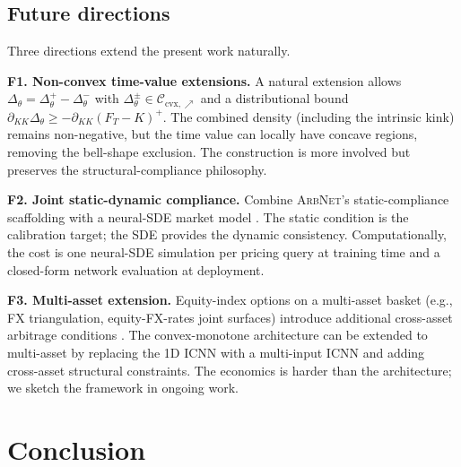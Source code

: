 \documentclass[largeformat]{interact}
\let\cite\citep   %
\theoremstyle{plain}
\theoremstyle{definition}
\newcommand{\arbnet}{\textsc{ArbNet}}
\begin{document}
\subsection{Future directions}
\label{sec:future}

Three directions extend the present work naturally.

\smallskip\noindent\textbf{F1. Non-convex time-value extensions.}
A natural extension allows $\Delta_\theta = \Delta^{+}_\theta - \Delta^{-}_\theta$ with $\Delta^{\pm}_\theta \in \mathcal{C}_{\mathrm{cvx},\nearrow}$ and a distributional bound $\partial_{KK}\Delta_\theta \geq -\partial_{KK}(F_T - K)^+$. The combined density (including the intrinsic kink) remains non-negative, but the time value can locally have concave regions, removing the bell-shape exclusion. The construction is more involved but preserves the structural-compliance philosophy.

\smallskip\noindent\textbf{F2. Joint static-dynamic compliance.}
Combine \arbnet{}'s static-compliance scaffolding with a neural-SDE market model \cite{cohen2023arbitrage}. The static condition is the calibration target; the SDE provides the dynamic consistency. Computationally, the cost is one neural-SDE simulation per pricing query at training time and a closed-form network evaluation at deployment.

\smallskip\noindent\textbf{F3. Multi-asset extension.}
Equity-index options on a multi-asset basket (e.g., FX triangulation, equity-FX-rates joint surfaces) introduce additional cross-asset arbitrage conditions \cite{carr2005note}. The convex-monotone architecture can be extended to multi-asset by replacing the 1D ICNN with a multi-input ICNN and adding cross-asset structural constraints. The economics is harder than the architecture; we sketch the framework in ongoing work.

\section{Conclusion}
\label{sec:conclusion}
\end{document}
